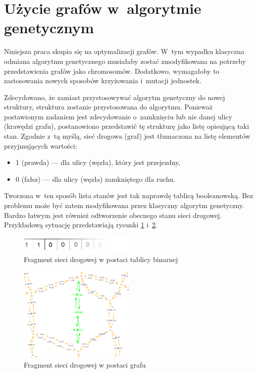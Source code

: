 \documentclass[twoside,12pt]{report}
\begin{document}
\section{Użycie grafów w~algorytmie genetycznym}

Niniejsza praca skupia się na optymalizacji grafów. W~tym wypadku klasyczna odmiana algorytmu genetycznego musiałaby zostać zmodyfikowana na potrzeby przedstawienia grafów jako chromosomów. Dodatkowo, wymagałoby to zastosowania nowych sposobów krzyżowania i~mutacji jednostek. 

Zdecydowano, że zamiast przystosowywać algorytm genetyczny do nowej struktury, struktura zostanie przystosowana do algorytmu. Ponieważ postawionym zadaniem jest zdecydowanie o~zamknięciu lub nie danej ulicy (krawędzi grafu), postanowiono przedstawić tę strukturę jako listę opisującą taki stan. Zgodnie z~tą myślą, sieć drogowa (graf) jest tłumaczona na listę elementów przyjmujących wartości:

\begin{itemize}
\item 1 (prawda) --- dla ulicy (węzła), który jest przejezdny,
\item 0 (fałsz) --- dla ulicy (węzła) zamkniętego dla ruchu.
\end{itemize}

Tworzona w~ten sposób lista stanów jest tak naprawdę tablicą booleanowską. Bez problemu może być zatem modyfikowana przez klasyczny algorytm genetyczny. Bardzo łatwym jest również odtworzenie obecnego stanu sieci drogowej. Przykładową sytuację przedstawiają rysunki \ref{fig:bool_network_example} i~\ref{fig:graph_network_example}.

\begin{figure}[htbp]
	\centering
	\includegraphics[width=0.5\textwidth]{img/bool}
	\caption{Fragment sieci drogowej w postaci tablicy binarnej }
	\label{fig:bool_network_example}
\end{figure}
\begin{figure}[htbp]
	\centering
	\includegraphics[width=0.5\textwidth]{img/bool-efect}
	\caption{Fragment sieci drogowej w postaci grafu}
	\label{fig:graph_network_example}
\end{figure}
\end{document}
